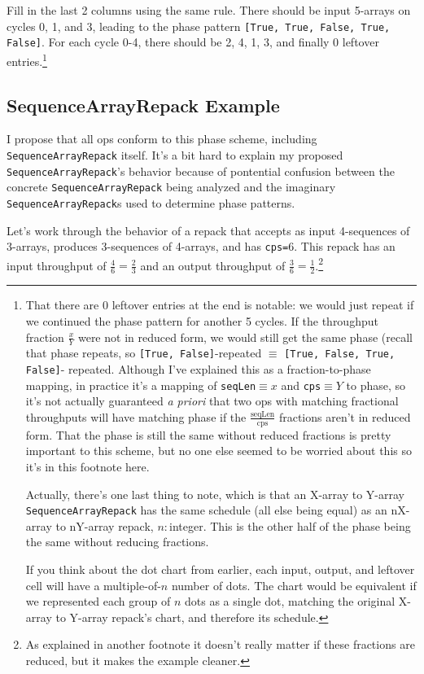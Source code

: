 \documentclass[12pt]{article}
\begin{document}
Fill in the last 2 columns using the same rule. There should be
input 5-arrays on cycles 0, 1, and 3, leading to the phase pattern
\texttt{[True, True, False, True, False]}. For each cycle 0-4, there
should be 2, 4, 1, 3, and finally 0 leftover entries.\footnote{
That there are 0 leftover entries at the end is notable: we would
just repeat if we continued the phase pattern for another 5 cycles.
If the throughput fraction $\frac{x}{Y}$ were not in reduced form, we
would still get the same phase (recall that phase repeats, so
\texttt{[True, False]}-repeated $\equiv$ \texttt{[True, False, True, False]}-%
repeated. Although I've explained this as a fraction-to-phase mapping,
in practice it's a mapping of \texttt{seqLen}$\equiv x$ and
\texttt{cps}$\equiv Y$ to phase, so it's not actually guaranteed
\textit{a priori} that two ops with matching fractional throughputs
will have matching phase if the $\frac{\text{seqLen}}{\text{cps}}$
fractions aren't in reduced form. That the phase is still the same
without reduced fractions is pretty important to this scheme, but
no one else seemed to be worried about this so it's in this footnote
here.

Actually, there's one last thing to note, which is that an
X-array to Y-array \texttt{SequenceArrayRepack} has the same schedule
(all else being equal) as an nX-array to nY-array repack, $n:$integer.
This is the other half of the phase being the same without reducing
fractions.

If you think about the dot chart from earlier, each input, output,
and leftover cell will have a multiple-of-$n$ number of dots. The
chart would be equivalent if we represented each group of $n$ dots
as a single dot, matching the original X-array to Y-array repack's chart,
and therefore its schedule.}

\subsection{SequenceArrayRepack Example}

I propose that all ops conform to this phase scheme, including
\texttt{SequenceArrayRepack} itself. It's a bit hard to explain my
proposed \texttt{SequenceArrayRepack}'s behavior because of pontential
confusion between the concrete \texttt{SequenceArrayRepack} being
analyzed and the imaginary \texttt{SequenceArrayRepack}s used to
determine phase patterns.

Let's work through the behavior of a repack that accepts as input
4-sequences of 3-arrays, produces 3-sequences of 4-arrays, and has
\texttt{cps=}6. This repack has an input throughput of
$\frac{4}{6} = \frac{2}{3}$
and an output throughput of $\frac{3}{6} = \frac{1}{2}$.\footnote{
As explained in another footnote it doesn't really matter if these
fractions are reduced, but it makes the example cleaner.
}
\end{document}
